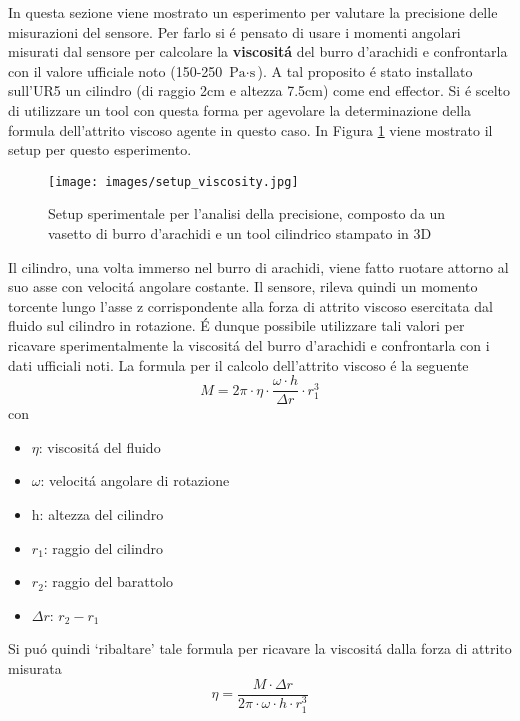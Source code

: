 In questa sezione viene mostrato un esperimento per valutare la precisione delle misurazioni del sensore\footnotemark{}. 
Per farlo si \'{e} pensato di usare i momenti angolari misurati dal sensore per calcolare la \textbf{viscosit\'{a}} del burro 
d'arachidi e confrontarla con il valore ufficiale noto (150-250 $\text{Pa} \cdot \text{s}$). 
A tal proposito \'{e} stato installato sull'UR5 un cilindro (di raggio 2cm e altezza 7.5cm) come end effector. 
Si \'{e} scelto di utilizzare un tool con questa forma per agevolare la determinazione della formula dell'attrito viscoso agente 
in questo caso.
In Figura \ref{fig:peanut_butter} viene mostrato il setup per questo esperimento. 
\newpage
\begin{figure}[H]
    \centering
    \texttt{[image: images/setup\_viscosity.jpg]}
    \caption{Setup sperimentale per l'analisi della precisione, composto da un vasetto di burro d'arachidi e un tool 
    cilindrico stampato in 3D}
    \label{fig:peanut_butter}
\end{figure}
Il cilindro, una volta immerso nel burro di arachidi, viene fatto ruotare attorno al suo asse con velocit\'{a} angolare 
costante. Il sensore, rileva quindi un momento torcente lungo l'asse z corrispondente alla forza di attrito viscoso esercitata 
dal fluido sul cilindro in rotazione. \'{E} dunque possibile utilizzare tali valori per ricavare sperimentalmente 
la viscosit\'{a} del burro d'arachidi e confrontarla con i dati ufficiali noti. 
La formula per il calcolo dell'attrito viscoso \'{e} la seguente 
\begin{equation*}
    M = 2\pi \cdot \eta \cdot \frac{\omega \cdot h}{\Delta r} \cdot r_{1}^{3}
\end{equation*}
con 
\begin{itemize}
    \item $\eta$: viscosit\'{a} del fluido
    \item $\omega$: velocit\'{a} angolare di rotazione
    \item h: altezza del cilindro
    \item $r_{1}$: raggio del cilindro
    \item $r_{2}$: raggio del barattolo
    \item $\Delta r$: $r_{2} - r_{1}$
\end{itemize}
Si pu\'{o} quindi `ribaltare' tale formula per ricavare la viscosit\'{a} dalla forza di attrito misurata 
\begin{equation} \label{eq:eta}
    \eta = \frac{M \cdot \Delta r}{2\pi \cdot \omega \cdot h \cdot r_{1}^{3}}
\end{equation}
